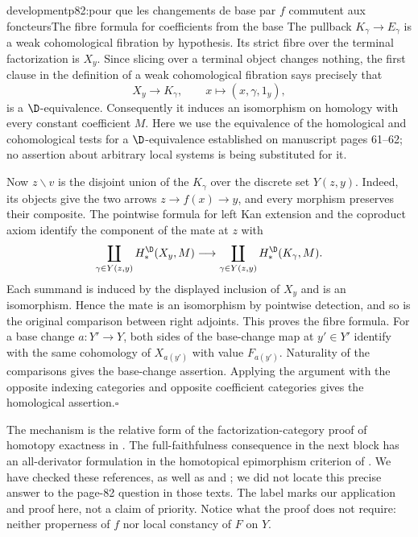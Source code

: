 \begin{dcomment}{development}{p82:pour que les changements de base par $f$ commutent aux foncteurs}{The fibre formula for coefficients from the base}
The pullback $K_\gamma\to E_\gamma$ is a weak cohomological fibration by hypothesis. Its strict fibre over the terminal factorization is $X_y$. Since slicing over a terminal object changes nothing, the first clause in the definition of a weak cohomological fibration says precisely that
\[
 X_y\longrightarrow K_\gamma,
 \qquad x\longmapsto(x,\gamma,1_y),
\]
is a $\D$-equivalence. Consequently it induces an isomorphism on homology with every constant coefficient $M$. Here we use the equivalence of the homological and cohomological tests for a $\D$-equivalence established on manuscript pages 61--62; no assertion about arbitrary local systems is being substituted for it.

Now $z\backslash v$ is the disjoint union of the $K_\gamma$ over the discrete set $Y(z,y)$. Indeed, its objects give the two arrows $z\to f(x)\to y$, and every morphism preserves their composite. The pointwise formula for left Kan extension and the coproduct axiom identify the component of the mate at $z$ with
\[
 \coprod_{\gamma\in Y(z,y)}H_*^{\D}(X_y,M)
 \longrightarrow
 \coprod_{\gamma\in Y(z,y)}H_*^{\D}(K_\gamma,M).
\]
Each summand is induced by the displayed inclusion of $X_y$ and is an isomorphism. Hence the mate is an isomorphism by pointwise detection, and so is the original comparison between right adjoints. This proves the fibre formula. For a base change $a:Y'\to Y$, both sides of the base-change map at $y'\in Y'$ identify with the same cohomology of $X_{a(y')}$ with value $F_{a(y')}$. Naturality of the comparisons gives the base-change assertion. Applying the argument with the opposite indexing categories and opposite coefficient categories gives the homological assertion.\hfill$\square$

The mechanism is the relative form of the factorization-category proof of homotopy exactness in \citet[Theorem 3.8]{GrothPontoShulman2014}. The full-faithfulness consequence in the next block has an all-derivator formulation in the homotopical epimorphism criterion of \citet[Theorem 6.10]{GrothStovicek2016Trees}. We have checked these references, as well as \citet{Maltsiniotis2005Asphericite} and \citet{Cisinski2009LocallyConstant}; we did not locate this precise answer to the page-82 question in those texts. The label marks our application and proof here, not a claim of priority. Notice what the proof does not require: neither properness of $f$ nor local constancy of $F$ on $Y$.
\end{dcomment}

